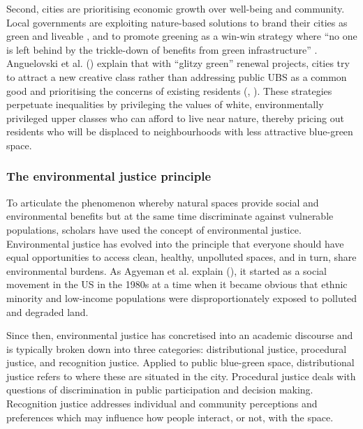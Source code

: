 \documentclass{article}
\begin{document}
Second, cities are prioritising economic growth over well-being and community. Local governments are exploiting nature-based solutions to brand their cities as green and liveable
, and to promote greening as a win-win strategy where ``no one is left behind by the trickle-down of benefits from green infrastructure'' \parencite{anguelovski2021green}.
Anguelovski et al. (\citeyear{anguelovski2021green}) explain that with ``glitzy green'' renewal projects, cities try to attract a new creative class rather than addressing public UBS as a common good and prioritising the concerns of existing residents (\cite{wessells2014urban}, \cite{anguelovski2020expanding}).
These strategies perpetuate inequalities by privileging the values of white, environmentally privileged upper classes who can afford to live near nature, thereby pricing out residents who will be displaced to neighbourhoods with less attractive blue-green space.

\subsubsection{The environmental justice principle}

To articulate the phenomenon whereby natural spaces provide social and environmental benefits but at the same time discriminate against vulnerable populations, scholars have used the concept of environmental justice.
Environmental justice has evolved into the principle that everyone should have equal opportunities to access clean, healthy, unpolluted spaces, and in turn, share environmental burdens. As Agyeman et al. explain (\citeyear{agyeman2016trends}), it started as a social movement in the US in the 1980s at a time when it became obvious that ethnic minority and low-income populations were disproportionately exposed to polluted and degraded land.

Since then, environmental justice has concretised into an academic discourse and is typically broken down into three categories: distributional justice, procedural justice, and recognition justice.
Applied to public blue-green space, distributional justice refers to where these are situated in the city.
Procedural justice deals with questions of discrimination in public participation and decision making. 
Recognition justice addresses individual and community perceptions and preferences which may influence how people interact, or not, with the space.
\end{document}
